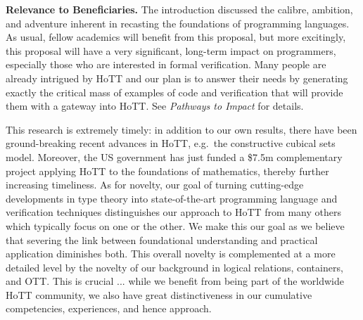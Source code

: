 \documentclass[a4paper,11pt]{article}
\newcommand{\eg}{{e.g.}\ }
\begin{document}
\vspace*{-0.1in}


{\bf Relevance to Beneficiaries.} The introduction discussed the
calibre, ambition, and adventure inherent in recasting the foundations
of programming languages. As usual, fellow academics
will benefit from this proposal, but more excitingly, this proposal will have a very
significant, long-term impact on programmers, especially those
who are interested in formal verification. Many people are
already intrigued by HoTT and our plan is to answer their needs by
generating exactly the critical mass of examples of code and
verification that will provide them with a gateway into HoTT. See {\em
  Pathways to Impact} for details. 

 This research is extremely timely:
in addition to our own results, there have been ground-breaking
recent advances in HoTT, \eg the constructive cubical sets model. Moreover, the
US government has just funded a \$7.5m complementary project applying
HoTT to the foundations of mathematics, thereby further increasing
timeliness. As for novelty, our goal of turning cutting-edge
developments in type theory into state-of-the-art programming language
and verification techniques distinguishes our approach to HoTT from
many others which typically focus on one or the other. We make this
our goal as we believe that severing the link between foundational
understanding and practical application diminishes both. This overall
novelty is complemented at a more detailed level by the novelty of our
background in logical relations, containers, and OTT. This is crucial
... while we benefit from being part of the worldwide HoTT community,
we also have great distinctiveness in our cumulative
competencies, experiences, and hence approach.
 
\end{document}
